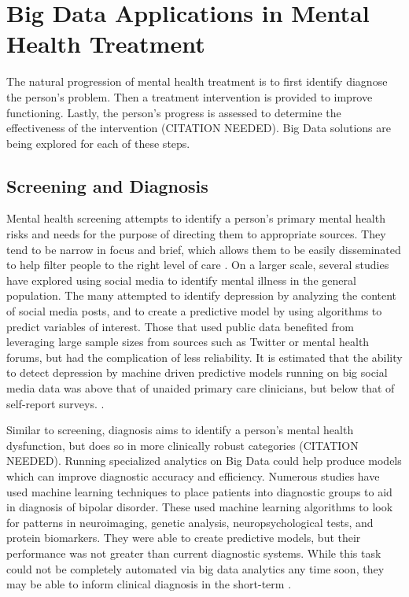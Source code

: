\documentclass[sigconf]{acmart}
\begin{document}
\section{Big Data Applications in Mental Health Treatment}
The natural progression of mental health treatment is to first identify diagnose the person's problem. Then a treatment intervention is provided to improve functioning. Lastly, the person's progress is assessed to determine the effectiveness of the intervention (CITATION NEEDED). Big Data solutions are being explored for each of these steps.
\subsection{Screening and Diagnosis}
Mental health screening attempts to identify a person's primary mental health risks and needs for the purpose of directing them to appropriate sources. They tend to be narrow in focus and brief, which allows them to be easily disseminated to help filter people to the right level of care \cite{apapractscreeassess}. 
On a larger scale, several studies have explored using social media to identify mental illness in the general population. The many attempted to identify depression by analyzing the content of social media posts, and to create a predictive model by using algorithms to predict variables of interest. Those that used public data benefited from leveraging large sample sizes from sources such as Twitter or mental health forums, but had the complication of less reliability. It is estimated that the ability to detect depression by machine driven predictive models running on big social media data was above that of unaided primary care clinicians, but below that of self-report surveys. \cite{detectdepressionsocialmedia}.

Similar to screening, diagnosis aims to identify a person's mental health dysfunction, but does so in more clinically robust categories (CITATION NEEDED). 
Running specialized analytics on Big Data could help produce models which can improve diagnostic accuracy and efficiency. Numerous studies have used machine learning techniques to place patients into diagnostic groups to aid in diagnosis of bipolar disorder. These used machine learning algorithms to look for patterns in neuroimaging, genetic analysis, neuropsychological tests, and protein biomarkers. They were able to create predictive models, but their performance was not greater than current diagnostic systems. While this task could not be completely automated via big data analytics any time soon, they may be able to inform clinical diagnosis in the short-term \cite{machinelearnbipolar} \cite{bigdatabipolar}.
\end{document}
